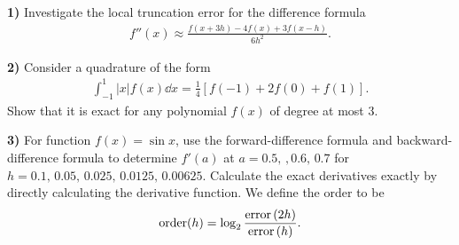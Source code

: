 \documentclass[12pt,a4paper]{article}
\newcommand{\prob}[2]{\textbf{#1)} #2}
\begin{document}
\prob{1}{
Investigate the local truncation error for the difference formula
\begin{align*}
    f''(x) \approx \frac{f(x+3h) - 4f(x) + 3f(x-h)}{6h^2}
.\end{align*}
}

\prob{2}{
Consider a quadrature of the form
\begin{align*}
    \int_{-1}^{1} \left| x \right| f(x) \dd{x} = \frac{1}{4} \left[ f(-1) + 2f(0) + f(1) \right]
.\end{align*}
Show that it is exact for any polynomial $f(x)$ of degree at most 3.
}

\prob{3}{
    For function $f(x) = \sin{x}$, use the forward-difference formula and backward-difference formula to determine $f'(a)$ at $a = 0.5,\,,0.6,\,0.7$ for $h = 0.1,\,0.05,\,0.025,\,0.0125,\,0.00625$.
    Calculate the exact derivatives exactly by directly calculating the derivative function.
    We define the order to be
    \begin{align*}
        {\rm order}(h) = \log_2{\frac{{\rm error}\left( 2h \right)}{{\rm error}\left( h \right)}}
    .\end{align*}
}

\begin{table}[H]
    \centering
    
\end{table}

\begin{table}[H]
    \centering
    
\end{table}

\begin{table}[H]
    \centering
    
\end{table}
\end{document}
